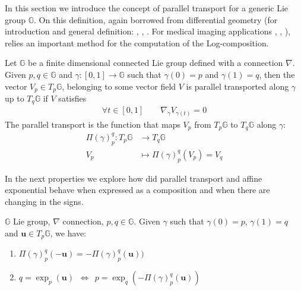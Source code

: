 In this section we introduce the concept of parallel transport for a generic Lie group $\mathbb{G}$. On this definition, again borrowed from differential geometry (for introduction and general definition: \cite{misner1973gravitation}, \cite{knebelman1951spaces}, \cite{kheyfets2000schild}. For medical imaging applications \cite{lorenzi2011schild}, \cite{lorenzi2013geodesics} \cite{lorenzi2014efficient}, \cite{pennec2011parallel} ), relies an important method for the computation of the Log-composition.

\begin{definition}
	Let $\mathbb{G}$ be a finite dimensional connected Lie group defined with a connection $\nabla$. Given $p,q \in \mathbb{G}$ and $\gamma : [0,1] \rightarrow \mathbb{G}$ such that $\gamma(0) = p$ and $\gamma(1) = q$, then the vector $V_{p} \in T_{p}\mathbb{G}$, belonging to some vector field $V$ is parallel transported along $\gamma$ up to $T_{q}\mathbb{G}$ if $V$ satisfies
	\begin{align*}
	\forall t \in  [0,1]
	\qquad
	\nabla_{\dot{\gamma}}V_{\gamma(t)} = 0
	\end{align*}
	The parallel transport is the function that maps $V_{p}$ from $T_{p}\mathbb{G}$ to $T_{q}\mathbb{G}$ along $\gamma$:
	\begin{align*}
	\Pi(\gamma)_{p}^{q} :  T_{p}\mathbb{G} & \longrightarrow T_{q}\mathbb{G}  \\
	V_{p}&\longmapsto \Pi(\gamma)_{p}^{q}(V_{p}) = V_{q}
	\end{align*}
\end{definition}
\noindent
In the next properties we explore how did parallel transport and affine exponential behave when expressed as a composition and when there are changing in the signs.
\begin{prop}[Inversion]
	$\mathbb{G}$ Lie group, $\nabla$ connection, $p,q\in\mathbb{G}$. Given $\gamma$ such that $\gamma(0)= p$, $\gamma(1)=q$ and $\mathbf{u}\in T_{p}\mathbb{G}$, we have:
	\begin{enumerate}
	\item $\Pi(\gamma)_{p}^{q}(-\mathbf{u}) = -\Pi(\gamma)_{p}^{q}(\mathbf{u}) )$
	\item $q = \exp_{p}(\mathbf{u}) \phantom{z} \Longleftrightarrow \phantom{z} p = \exp_{q}(-\Pi(\gamma)_{p}^{q}(\mathbf{u}))$
	\end{enumerate}
\end{prop}

